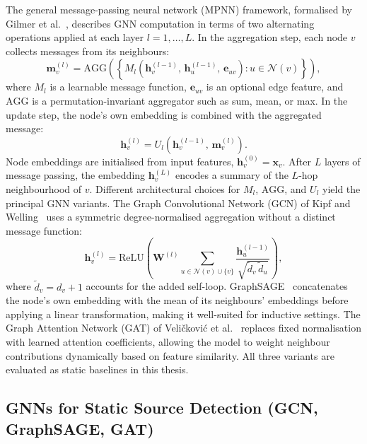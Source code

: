 The general message-passing neural network (MPNN) framework, formalised by Gilmer et al.~\cite{Gilmer2017}, describes GNN computation in terms of two alternating operations applied at each layer $l = 1, \ldots, L$. In the aggregation step, each node $v$ collects messages from its neighbours:
\[
    \mathbf{m}_v^{(l)} = \mathrm{AGG}\!\left(\left\{M_l\!\left(\mathbf{h}_v^{(l-1)},\, \mathbf{h}_u^{(l-1)},\, \mathbf{e}_{uv}\right) : u \in \mathcal{N}(v)\right\}\right),
\]
where $M_l$ is a learnable message function, $\mathbf{e}_{uv}$ is an optional edge feature, and $\mathrm{AGG}$ is a permutation-invariant aggregator such as sum, mean, or max. In the update step, the node's own embedding is combined with the aggregated message:
\[
    \mathbf{h}_v^{(l)} = U_l\!\left(\mathbf{h}_v^{(l-1)},\, \mathbf{m}_v^{(l)}\right).
\]
Node embeddings are initialised from input features, $\mathbf{h}_v^{(0)} = \mathbf{x}_v$. After $L$ layers of message passing, the embedding $\mathbf{h}_v^{(L)}$ encodes a summary of the $L$-hop neighbourhood of $v$. Different architectural choices for $M_l$, $\mathrm{AGG}$, and $U_l$ yield the principal GNN variants. The Graph Convolutional Network (GCN) of Kipf and Welling~\cite{Kipf2017} uses a symmetric degree-normalised aggregation without a distinct message function:
\[
    \mathbf{h}_v^{(l)} = \mathrm{ReLU}\!\left(\mathbf{W}^{(l)} \sum_{u \in \mathcal{N}(v) \cup \{v\}} \frac{\mathbf{h}_u^{(l-1)}}{\sqrt{\tilde{d}_v\,\tilde{d}_u}}\right),
\]
where $\tilde{d}_v = d_v + 1$ accounts for the added self-loop. GraphSAGE~\cite{Hamilton2017} concatenates the node's own embedding with the mean of its neighbours' embeddings before applying a linear transformation, making it well-suited for inductive settings. The Graph Attention Network (GAT) of Veli\v{c}kovi\'{c} et al.~\cite{Velickovic2018} replaces fixed normalisation with learned attention coefficients, allowing the model to weight neighbour contributions dynamically based on feature similarity. All three variants are evaluated as static baselines in this thesis.

\subsection{GNNs for Static Source Detection (GCN, GraphSAGE, GAT)}

